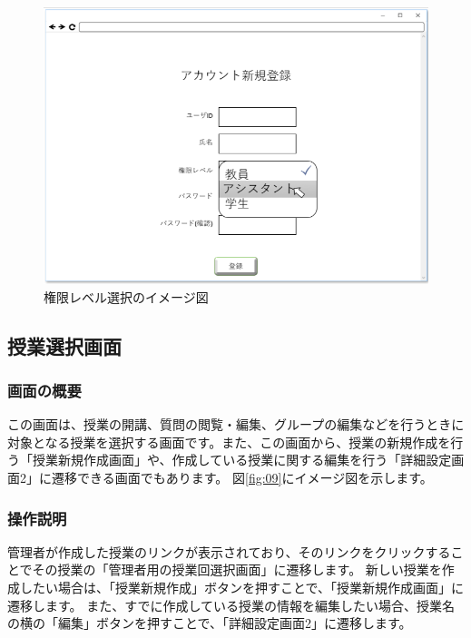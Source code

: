 \begin{figure}[phtbp]
  \begin{center}
    \includegraphics[width=1\linewidth,clip]{./img/08.png}
    \caption{権限レベル選択のイメージ図}\label{fig:08}
  \end{center}
\end{figure}

\newpage

\subsection{授業選択画面}
\subsubsection{画面の概要}
この画面は、授業の開講、質問の閲覧・編集、グループの編集などを行うときに対象となる授業を選択する画面です。また、この画面から、授業の新規作成を行う「授業新規作成画面」や、作成している授業に関する編集を行う「詳細設定画面2」に遷移できる画面でもあります。
図\ref{fig:09}にイメージ図を示します。

\subsubsection{操作説明}
管理者が作成した授業のリンクが表示されており、そのリンクをクリックすることでその授業の「管理者用の授業回選択画面」に遷移します。
新しい授業を作成したい場合は、「授業新規作成」ボタンを押すことで、「授業新規作成画面」に遷移します。
また、すでに作成している授業の情報を編集したい場合、授業名の横の「編集」ボタンを押すことで、「詳細設定画面2」に遷移します。

